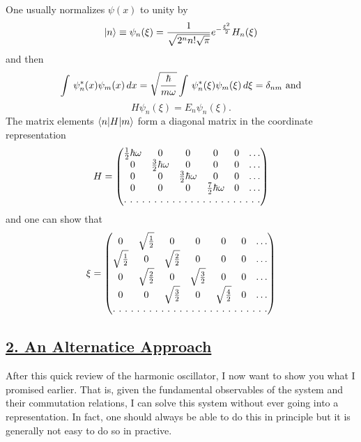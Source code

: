 One usually normalizes $\psi(x)$ to unity by
$$|n\rangle \equiv \psi_n(\xi) = {1\over\sqrt{2^n n!\sqrt{\pi}}}e^{-{\xi^2\over 2}} H_n(\xi)$$ and then 
$$\int\, \psi^*_n(x) \psi_m(x)\, dx = \sqrt{{\hbar\over m\omega}} \int\, \psi^*_n(\xi) \psi_m(\xi)\, d\xi = \delta_{nm}\mbox{  and}$$
$$H\psi_n(\xi) = E_n\psi_n(\xi).$$
The matrix elements $\langle n| H| m \rangle$ form a diagonal matrix in the coordinate representation
\[ H = \begin{pmatrix}
\half\hbar\omega & 0  & 0 & 0& 0& \hdots  \\
0  & {3\over2} \hbar\omega & 0&  0& 0& \hdots  \\
0 & 0   & {3\over2}\hbar\omega& 0& 0& \hdots \\
0 & 0   & 0 & {7\over2}\hbar\omega & 0& \hdots \\
\hdotsfor[2]{6}\\
\end{pmatrix} \]
and one can show that 
\[ \xi  = \begin{pmatrix}
0 & \sqrt{1\over2} & 0  & 0 & 0& 0& \hdots  \\
\sqrt{1\over2} & 0  & \sqrt{2\over2} & 0&  0& 0& \hdots  \\
0& \sqrt{2\over2}  & 0   & \sqrt{3\over2}& 0& 0& \hdots \\
0& 0 & \sqrt{3\over2}   & 0 & \sqrt{4\over2} & 0& \hdots \\
\hdotsfor[2]{7}\\
\end{pmatrix} \]

\subsection{\underline{2. An Alternatice Approach}}
After this quick review of the harmonic oscillator, I now want to show you what I promised earlier. That is, given the fundamental observables of the system and their commutation relations, I can 
solve this system without ever going into a representation. In fact, one should always be able to do this in principle but it is generally not easy to do so in practive. 


